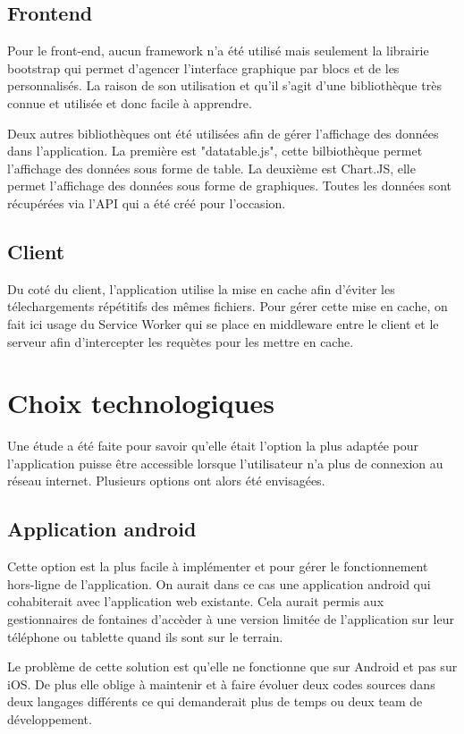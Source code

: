 \documentclass{EPL-master-thesis-covers-FR}
\begin{document}
			\subsection*{Frontend}
				Pour le front-end, aucun framework n'a été utilisé mais seulement la librairie bootstrap qui permet d'agencer l'interface graphique par blocs et de les personnalisés. La raison de son utilisation et qu'il s'agit d'une bibliothèque très connue et utilisée et donc facile à apprendre.
				
				Deux autres bibliothèques ont été utilisées afin de gérer l'affichage des données dans l'application. La première est "datatable.js", cette bilbiothèque permet l'affichage des données sous forme de table. La deuxième est Chart.JS, elle permet l'affichage des données sous forme de graphiques. Toutes les données sont récupérées via l'API qui a été créé pour l'occasion.
				
			\subsection*{Client}
				Du coté du client, l'application utilise la mise en cache afin d'éviter les télechargements répétitifs des mêmes fichiers. Pour gérer cette mise en cache, on fait ici usage du Service Worker qui se place en middleware entre le client et le serveur afin d'intercepter les requètes pour les mettre en cache.

		
		\section{Choix technologiques}
			\label{sec:choix_tech}
			Une étude a été faite pour savoir qu'elle était l'option la plus adaptée pour l'application puisse être accessible lorsque l'utilisateur n'a plus de connexion au réseau internet. Plusieurs options ont alors été envisagées.
			
			\subsection*{Application android}
				Cette option est la plus facile à implémenter et pour gérer le fonctionnement hors-ligne de l'application. On aurait dans ce cas une application android qui cohabiterait avec l'application web existante. Cela aurait permis aux gestionnaires de fontaines d'accèder à une version limitée de l'application sur leur téléphone ou tablette quand ils sont sur le terrain.
			
				Le problème de cette solution est qu'elle ne fonctionne que sur Android et pas sur iOS. De plus elle oblige à maintenir et à faire évoluer deux codes sources dans deux langages différents ce qui demanderait plus de temps ou deux team de développement.
				
\end{document}
